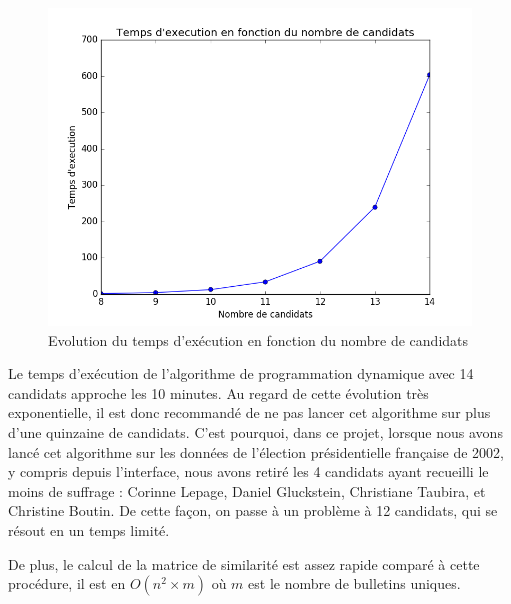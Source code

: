 \documentclass[11pt, a4paper]{article}
\begin{document}
\begin{figure}[H]
\begin{center}
\includegraphics[scale=0.8]{Images/temps-nbCandidats.png}
\caption{Evolution du temps d'exécution en fonction du nombre de candidats}
\end{center}
\end{figure}


Le temps d'exécution de l'algorithme de programmation dynamique avec 14 candidats approche les 10 minutes. Au regard de cette évolution très exponentielle, il est donc recommandé de ne pas lancer cet algorithme sur plus d'une quinzaine de candidats. C'est pourquoi, dans ce projet, lorsque nous avons lancé cet algorithme sur les données de l'élection présidentielle française de 2002, y compris depuis l'interface, nous avons retiré les 4 candidats ayant recueilli le moins de suffrage : Corinne Lepage, Daniel Gluckstein, Christiane Taubira, et Christine Boutin. De cette façon, on passe à un problème à 12 candidats, qui se résout en un temps limité.

De plus, le calcul de la matrice de similarité est assez rapide comparé à cette procédure, il est en $O(n^2\times m)$ où $m$ est le nombre de bulletins uniques.
\end{document}
